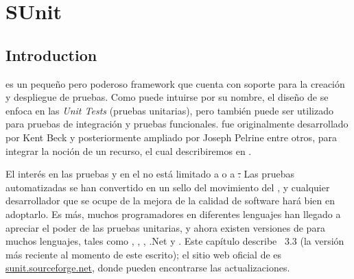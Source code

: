 \documentclass[a4paper,10pt,twoside]{book}
\begin{document}
	\sloppy
\fi
\chapter{SUnit}

\section{Introduction} 


 es un pequeño pero poderoso framework que cuenta con soporte para la
creación y despliegue de pruebas.
Como puede intuirse por su nombre, el diseño de \sunit se enfoca en las \emph{Unit Tests} (pruebas unitarias), 
pero también puede ser utilizado para pruebas de integración y pruebas funcionales.
\sunit fue originalmente desarrollado por Kent Beck y posteriormente ampliado por Joseph
Pelrine entre otros, para integrar la noción de un recurso,
el cual describiremos en .

El interés en las pruebas y en el 
no está limitado a \pharo o a \st.  
Las pruebas automatizadas se han convertido en un sello del movimiento del ,
y cualquier desarrollador que se ocupe de la mejora de la calidad de software hará bien en adoptarlo.
Es más, muchos programadores en diferentes lenguajes han llegado a apreciar el poder
de las pruebas unitarias, y ahora existen versiones de 
\xUnit{}  para muchos lenguajes, tales como , , , .Net y .
Este capítulo describe \SUnit~3.3 (la versión más reciente al momento de este escrito); el sitio web oficial de \sunit es
\url{sunit.sourceforge.net}, donde pueden encontrarse las actualizaciones.
\end{document}

